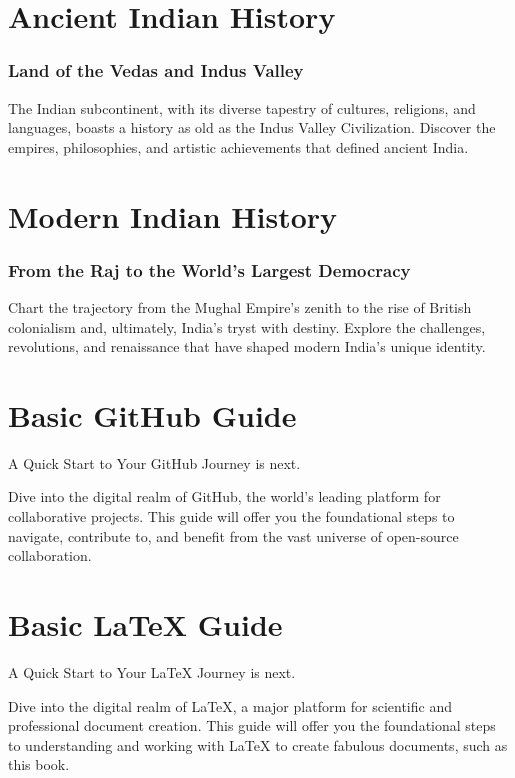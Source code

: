 \documentclass[a4paper,12pt]{book}
\begin{document}
\chapter{Ancient Indian History}
\subsection*{Land of the Vedas and Indus Valley}
The Indian subcontinent, with its diverse tapestry of cultures, religions, and languages, boasts a history as old as the Indus Valley Civilization. Discover the empires, philosophies, and artistic achievements that defined ancient India.

\chapter{Modern Indian History}
\subsection*{From the Raj to the World's Largest Democracy}
Chart the trajectory from the Mughal Empire's zenith to the rise of British colonialism and, ultimately, India's tryst with destiny. Explore the challenges, revolutions, and renaissance that have shaped modern India's unique identity.


\appendix
\chapter{Basic GitHub Guide}
A Quick Start to Your GitHub Journey is next.

Dive into the digital realm of GitHub, the world's leading platform for collaborative projects. This guide will offer you the foundational steps to navigate, contribute to, and benefit from the vast universe of open-source collaboration.

\chapter{Basic LaTeX Guide}
A Quick Start to Your LaTeX Journey is next.

Dive into the digital realm of LaTeX, a major platform for scientific and professional document creation. This guide will offer you the foundational steps to understanding and working with LaTeX to create fabulous documents, such as this book.



\printindex
\end{document}
